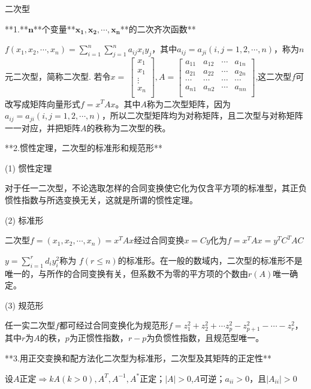 二次型

**1.**$\mathbf{n}$**个变量**$\mathbf{x}_{\mathbf{1}}\mathbf{,}\mathbf{x}_{\mathbf{2}}\mathbf{,\cdots,}\mathbf{x}_{\mathbf{n}}$**的二次齐次函数**

$f(x_{1},x_{2},\cdots,x_{n}) = \sum_{i = 1}^{n}{\sum_{j =1}^{n}{a_{{ij}}x_{i}y_{j}}}$，其中$a_{{ij}} = a_{{ji}}(i,j =1,2,\cdots,n)$，称为$n$元二次型，简称二次型. 若令$x = \ \begin{bmatrix}x_{1} \\ x_{1} \\  \vdots \\ x_{n} \\ \end{bmatrix},A = \begin{bmatrix}  a_{11}& a_{12}& \cdots & a_{1n} \\  a_{21}& a_{22}& \cdots & a_{2n} \\ \cdots &\cdots &\cdots &\cdots \\  a_{n1}& a_{n2} & \cdots & a_{{nn}} \\\end{bmatrix}$,这二次型$f$可改写成矩阵向量形式$f =x^{T}{Ax}$。其中$A$称为二次型矩阵，因为$a_{{ij}} =a_{{ji}}(i,j =1,2,\cdots,n)$，所以二次型矩阵均为对称矩阵，且二次型与对称矩阵一一对应，并把矩阵$A$的秩称为二次型的秩。

**2.惯性定理，二次型的标准形和规范形**

(1) 惯性定理

对于任一二次型，不论选取怎样的合同变换使它化为仅含平方项的标准型，其正负惯性指数与所选变换无关，这就是所谓的惯性定理。

(2) 标准形

二次型$f = \left( x_{1},x_{2},\cdots,x_{n} \right) =x^{T}{Ax}$经过合同变换$x = {Cy}$化为$f = x^{T}{Ax} =y^{T}C^{T}{AC}$

$y = \sum_{i = 1}^{r}{d_{i}y_{i}^{2}}$称为 $f(r \leq n)$的标准形。在一般的数域内，二次型的标准形不是唯一的，与所作的合同变换有关，但系数不为零的平方项的个数由$r(A)$唯一确定。

(3) 规范形

任一实二次型$f$都可经过合同变换化为规范形$f = z_{1}^{2} + z_{2}^{2} + \cdots z_{p}^{2} - z_{p + 1}^{2} - \cdots -z_{r}^{2}$，其中$r$为$A$的秩，$p$为正惯性指数，$r -p$为负惯性指数，且规范型唯一。

**3.用正交变换和配方法化二次型为标准形，二次型及其矩阵的正定性**

设$A$正定$\Rightarrow {kA}(k > 0),A^{T},A^{- 1},A^{*}$正定；$|A| >0$,$A$可逆；$a_{{ii}} > 0$，且$|A_{{ii}}| > 0$

